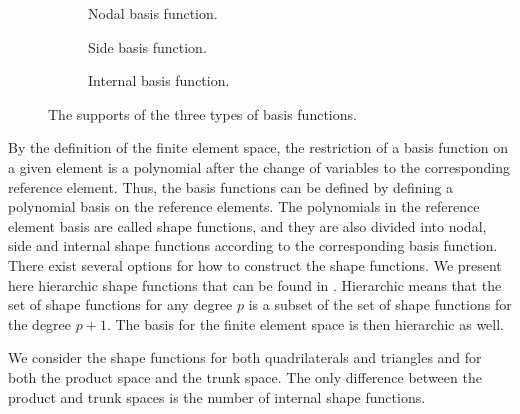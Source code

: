 \documentclass[english, 12pt, a4paper, sci, utf8, a-2b, online]{aaltothesis}
\theoremstyle{definition}
\theoremstyle{plain}
\numberwithin{equation}{section}
\begin{document}
\begin{figure}[b]
    \centering
    \begin{subfigure}[t]{0.3\textwidth}
        \centering
        \caption{Nodal basis function.}
        \label{fig:basis_support_nodal}
    \end{subfigure}
    \hfill
    \begin{subfigure}[t]{0.3\textwidth}
        \centering
        \caption{Side basis function.}
        \label{fig:basis_support_side}
    \end{subfigure}
    \hfill
    \begin{subfigure}[t]{0.3\textwidth}
        \centering
        \caption{Internal basis function.}
        \label{fig:basis_support_internal}
    \end{subfigure}
    \caption{The supports of the three types of basis functions.}
    \label{fig:basis_support}
\end{figure}

By the definition of the finite element space,
the restriction of a basis function on a given element is a polynomial
after the change of variables to the corresponding reference element.
Thus, the basis functions can be defined by defining a polynomial basis on the reference elements.
The polynomials in the reference element basis are called shape functions,
and they are also divided into nodal, side and internal shape functions
according to the corresponding basis function.
There exist several options for how to construct the shape functions.
We present here hierarchic shape functions that can be found in \cite{szabobabuska2011}.
Hierarchic means that the set of shape functions for any degree $p$
is a subset of the set of shape functions for the degree $p+1$.
The basis for the finite element space is then hierarchic as well.

We consider the shape functions for both quadrilaterals and triangles
and for both the product space and the trunk space.
The only difference between the product and trunk spaces is the number of internal shape functions.
\end{document}
